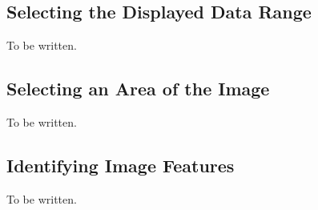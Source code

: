 \subsection {Selecting the Displayed Data Range}
To be written.

\subsection {Selecting an Area of the Image}
To be written.

\subsection {Identifying Image Features}
To be written.


